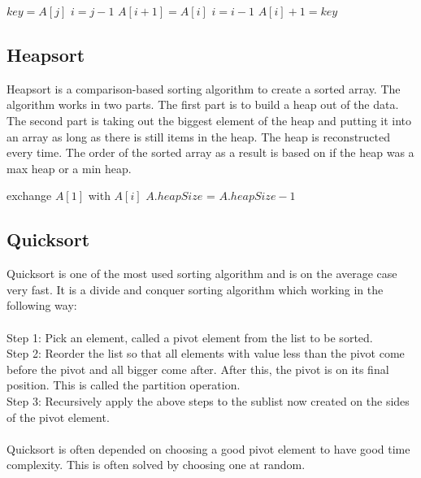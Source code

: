 \documentclass[a4paper, 10pt]{article}
\begin{document}
\begin{algorithmic}
\begin{algorithmic}
        \State $key = A[j]$ 
        \State $i = j - 1$ 
                \State $A[i + 1] = A[i]$ 
                \State $i = i - 1$ 
        \EndWhile
        \State $A[i] + 1 = key$ 
\EndFor
\end{algorithmic}


\subsection{Heapsort}
Heapsort is a comparison-based sorting algorithm to create a sorted array. The algorithm works in two parts. The first part is to build a heap out of the data. \\
The second part is taking out the biggest element of the heap and putting it into an array as long as there is still items in the heap. The heap is reconstructed every time. The order of the sorted array as a result is based on if the heap was a max heap or a min heap.
\\

\begin{algorithmic}
\State {} 
        \State exchange $A[1]$ with $A[i]$
        \State $A.heapSize$ = $A.heapSize -1$
        \State {} 
\EndFor
\end{algorithmic}

\subsection{Quicksort}
Quicksort is one of the most used sorting algorithm and is on the average case very fast. It is a divide and conquer sorting algorithm which working in the following way: \\\\ 
Step 1: Pick an element, called a pivot element from the list to be sorted.\\
Step 2: Reorder the list so that all elements with value less than the pivot come before the pivot and all bigger come after. After this, the pivot is on its final position. This is called the partition operation.\\
Step 3: Recursively apply the above steps to the sublist now created on the sides of the pivot element.
\\\\
Quicksort is often depended on choosing a good pivot element to have good time complexity. This is often solved by choosing one at random.
\\


\end{algorithmic}
\end{document}
